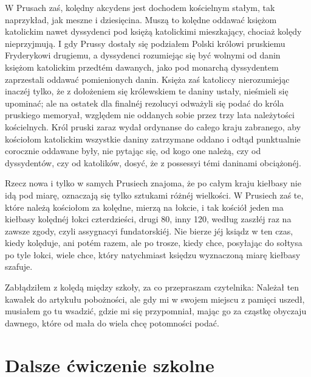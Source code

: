 \documentclass{book}
\begin{document}
W Prusach zaś, kolędny akcydens jest dochodem kościelnym stałym, tak naprzykład, jak meszne i dziesięcina. Muszą to kolędne oddawać księżom katolickim nawet dyssydenci pod księżą katolickimi mieszkający, chociaż kolędy nieprzyjmują. I gdy Prussy dostały się podziałem Polski królowi pruskiemu Fryderykowi drugiemu, a dyssydenci rozumiejąc się być wolnymi od danin księżom katolickim przedtém dawanych, jako pod monarchą dyssydentem zaprzestali oddawać pomienionych danin. Księża zaś katoliccy nierozumiejąc inaczéj tylko, że z dołożeniem się królewskiem te daniny ustały, nieśmieli się upominać; ale na ostatek dla finalnéj rezolucyi odważyli się podać do króla pruskiego memoryał, względem nie oddanych sobie przez trzy lata należytości kościelnych. Król pruski zaraz wydał ordynanse do całego kraju zabranego, aby kościołom katolickim wszystkie daniny zatrzymane oddano i odtąd punktualnie corocznie oddawane były, nie pytając się, od kogo one należą, czy od dyssydentów, czy od katolików, dosyć, że z possessyi témi daninami obciążonéj.

Rzecz nowa i tylko w samych Prusiech znajoma, że po całym kraju kiełbasy nie idą pod miarę, oznaczają się tylko sztukami różnéj wielkości. W Prusiech zaś te, które należą kościołom za kolędne, mierzą na łokcie, i tak kościół jeden ma kiełbasy kolędnéj łokci czterdzieści, drugi 80, inny 120, według zaszłéj raz na zawsze zgody, czyli assygnacyi fundatorskiéj. Nie bierze jéj ksiądz w ten czas, kiedy kolęduje, ani potém razem, ale po trosze, kiedy chce, posyłając do sołtysa po tyle łokci, wiele chce, który natychmiast księdzu wyznaczoną miarę kiełbasy szafuje.

Zabłądziłem z kolędą między szkoły, za co przepraszam czytelnika: Należał ten kawałek do artykułu pobożności, ale gdy mi w swojem miejscu z pamięci uszedł, musiałem go tu wsadzić, gdzie mi się przypomniał, mając go za cząstkę obyczaju dawnego, które od mała do wiela chcę potomności podać.

\section{Dalsze ćwiczenie szkolne}
\end{document}

